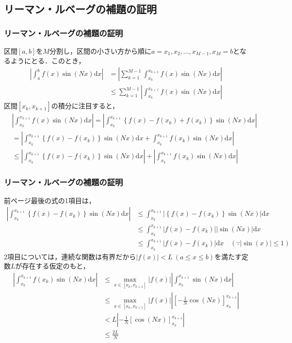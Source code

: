 \documentclass[dvipdfmx,graphicx,14pt]{beamer}
\begin{document}
\subsection{リーマン・ルベーグの補題の証明}

\begin{frame}[c]
    \frametitle{リーマン・ルベーグの補題の証明}
    \scriptsize
    区間$[a,b]$を$M$分割し，区間の小さい方から順に$a = x_{1}, x_{2}, ..., x_{M-1}, x_{M} = b$となるようにとる．このとき，
    \begin{align*}
        \left| \int_{a}^{b} f(x) \sin(Nx) \mathrm{d} x \right| &= \left| \sum_{k=1}^{M-1} \int_{x_{k}}^{x_{k+1}} f(x) \sin(Nx) \mathrm{d} x \right| \\
        &\leq \sum_{k=1}^{M-1} \left| \int_{x_{k}}^{x_{k+1}} f(x) \sin(Nx) \mathrm{d} x \right|
    \end{align*}
    区間$[x_{k}, x_{k+1}]$の積分に注目すると，
    \begin{align*}
        & \left| \int_{x_{k}}^{x_{k+1}} f(x) \sin(Nx) \mathrm{d} x \right| = \left| \int_{x_{k}}^{x_{k+1}} \left\{ f(x) - f(x_{k}) + f(x_{k}) \right\} \sin(Nx) \mathrm{d} x \right| \\
        &= \left| \int_{x_{k}}^{x_{k+1}} \left\{ f(x) - f(x_{k}) \right\} \sin(Nx) \mathrm{d} x + \int_{x_{k}}^{x_{k+1}} f(x_{k}) \sin(Nx) \mathrm{d} x \right| \\
        &\leq \left| \int_{x_{k}}^{x_{k+1}} \left\{ f(x) - f(x_{k}) \right\} \sin(Nx) \mathrm{d} x \right| + \left| \int_{x_{k}}^{x_{k+1}} f(x_{k}) \sin(Nx) \mathrm{d} x \right|
    \end{align*}
\end{frame}

\begin{frame}[c]
    \frametitle{リーマン・ルベーグの補題の証明}
    \scriptsize
    前ページ最後の式の1項目は，
    \begin{align*}
        \left| \int_{x_{k}}^{x_{k+1}} \left\{ f(x) - f(x_{k}) \right\} \sin(Nx) \mathrm{d} x \right| &\leq \int_{x_{k}}^{x_{k+1}} | \left\{ f(x) - f(x_{k}) \right\} \sin(Nx) | \mathrm{d} x \\
        &\leq \int_{x_{k}}^{x_{k+1}} | f(x) - f(x_{k}) | | \sin(Nx) | \mathrm{d} x \\
        &\leq \int_{x_{k}}^{x_{k+1}} | f(x) - f(x_{k}) | \mathrm{d} x \quad (\because |\sin(x)| \leq 1)
    \end{align*}
    2項目については，連続な関数は有界だから$|f(x)| < L\ (a \leq x \leq b)$を満たす定数$L$が存在する仮定のもと，
    \begin{align*}
        \left| \int_{x_{k}}^{x_{k+1}} f(x_{k}) \sin(Nx) \mathrm{d} x \right| &\leq \max_{x \in [x_{k},x_{k+1}]} |f(x)| \left| \int_{x_{k}}^{x_{k+1}} \sin(Nx) \mathrm{d} x \right| \\
        &\leq \max_{x \in [x_{k},x_{k+1}]} |f(x)| \left| \left[ -\frac{1}{N} \cos(Nx) \right]_{x_{k}}^{x_{k+1}} \right| \\
        &< L \left| -\frac{1}{N} \left[ \cos(Nx) \right]_{x_{k}}^{x_{k+1}} \right| \\
        &\leq \frac{2L}{N}
    \end{align*}
\end{frame}
\end{document}
